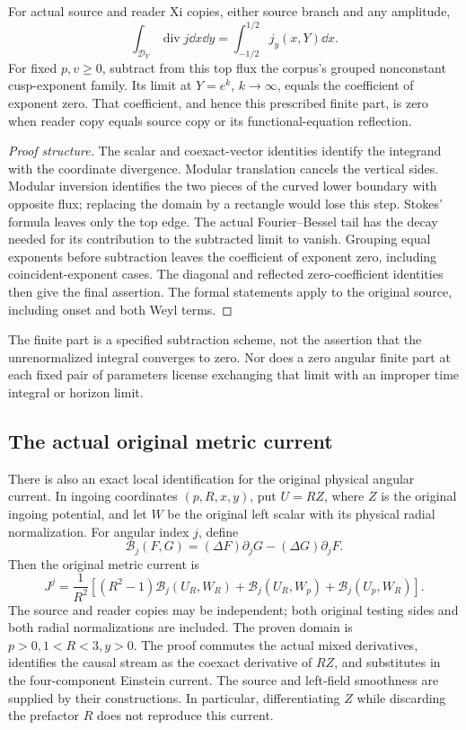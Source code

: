 \begin{theorem}\label{thm:modular}
For actual source and reader Xi copies, either source branch and any amplitude,
\[
 \int_{\mathcal D_Y}\operatorname{div}j\dd x\dd y
       =\int_{-1/2}^{1/2}j_y(x,Y)\dd x.
\]
For fixed \(p,v\ge0\), subtract from this top flux the corpus's grouped nonconstant cusp-exponent family. Its limit at \(Y=e^k\), \(k\to\infty\), equals the coefficient of exponent zero. That coefficient, and hence this prescribed finite part, is zero when reader copy equals source copy or its functional-equation reflection.
\end{theorem}
\begin{proof}[Proof structure]
The scalar and coexact-vector identities identify the integrand with the coordinate divergence. Modular translation cancels the vertical sides. Modular inversion identifies the two pieces of the curved lower boundary with opposite flux; replacing the domain by a rectangle would lose this step. Stokes' formula leaves only the top edge. The actual Fourier--Bessel tail has the decay needed for its contribution to the subtracted limit to vanish. Grouping equal exponents before subtraction leaves the coefficient of exponent zero, including coincident-exponent cases. The diagonal and reflected zero-coefficient identities then give the final assertion. The formal statements apply to the original source, including onset and both Weyl terms.
\end{proof}

The finite part is a specified subtraction scheme, not the assertion that the unrenormalized integral converges to zero. Nor does a zero angular finite part at each fixed pair of parameters license exchanging that limit with an improper time integral or horizon limit.

\subsection{The actual original metric current}

There is also an exact local identification for the original physical angular current. In ingoing coordinates \((p,R,x,y)\), put \(U=RZ\), where \(Z\) is the original ingoing potential, and let \(W\) be the original left scalar with its physical radial normalization. For angular index \(j\), define
\[
 \mathcal B_j(F,G)=(\Delta F)\partial_jG-(\Delta G)\partial_jF.
\]
Then the original metric current is
\begin{equation}\label{eq:originalcurrent}
 J^j=\frac1{R^2}\left[(R^2-1)\mathcal B_j(U_R,W_R)
                 +\mathcal B_j(U_R,W_p)+\mathcal B_j(U_p,W_R)\right].
\end{equation}
The source and reader copies may be independent; both original testing sides and both radial normalizations are included. The proven domain is \(p>0,1<R<3,y>0\).
The proof commutes the actual mixed derivatives, identifies the causal stream as the coexact derivative of \(RZ\), and substitutes in the four-component Einstein current. The source and left-field smoothness are supplied by their constructions. In particular, differentiating \(Z\) while discarding the prefactor \(R\) does not reproduce this current.

